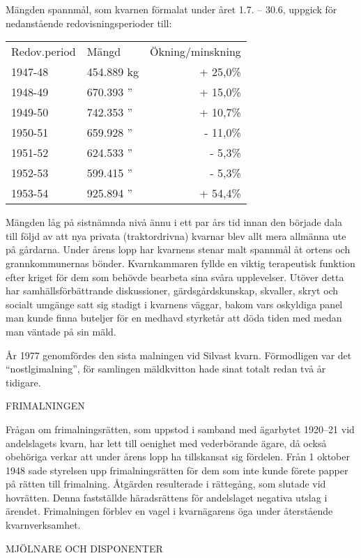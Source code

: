 Mängden spannmål, som kvarnen förmalat under året 1.7. – 30.6, uppgick för nedanstående redovisningsperioder till:
\begin{center}
  \begin{tabular}{l l r}
    \hline
    Redov.period & Mängd & Ökning/minskning \\
    1947-48	&	454.889 kg & + 25,0\% \\
    1948-49	&	670.393 '' & + 15,0\% \\
    1949-50	&	742.353 '' & + 10,7\% \\
    1950-51	&	659.928 '' & - 11,0\% \\
    1951-52	&	624.533 '' & -  5,3\% \\
    1952-53	&	599.415 '' & -  5,3\% \\
    1953-54	&	925.894 '' & + 54,4\% \\
    \hline
  \end{tabular}
\end{center}
Mängden låg på sistnämnda nivå ännu i ett par års tid innan den började dala till följd av att nya privata (traktordrivna) kvarnar blev allt mera allmänna ute på gårdarna. Under årens lopp har kvarnens stenar malt spannmål åt ortens och grannkommunernas bönder. Kvarnkammaren fyllde en viktig terapeutisk funktion efter kriget för dem som behövde bearbeta sina svåra upplevelser. Utöver detta har samhällsförbättrande diskussioner, gärdsgårdskunskap, skvaller, skryt och socialt umgänge satt sig stadigt i kvarnens väggar, bakom vars oskyldiga panel man kunde finna buteljer för en medhavd styrketår att döda tiden med medan man väntade på sin mäld.

År 1977 genomfördes den sista malningen vid Silvast kvarn. Förmodligen var det ``nostlgimalning'', för samlingen mäldkvitton hade sinat totalt redan två år tidigare.


FRIMALNINGEN

Frågan om frimalningsrätten, som uppstod i samband med ägarbytet 1920--21 vid andelslagets kvarn, har lett till oenighet med vederbörande ägare, då också obehöriga verkar att under årens lopp ha tillskansat sig fördelen. Från 1 oktober 1948 sade styrelsen upp frimalningsrätten för dem som inte kunde förete papper på rätten till frimalning. Åtgärden resulterade i rättegång, som slutade vid hovrätten. Denna fastställde häradsrättens för andelslaget negativa utslag i ärendet. Frimalningen förblev en vagel i kvarnägarens öga under återstående kvarnverksamhet.


MJÖLNARE OCH DISPONENTER

